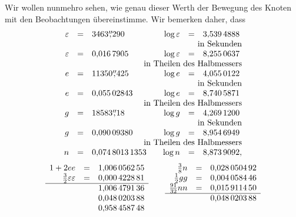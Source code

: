 \clearpage
\begingroup
{}
\renewcommand{\headrulewidth}{0pt}
\par\noindent\hspace*{\parindent}Wir wollen nunmehro sehen, wie genau dieser Werth der Bewegung des
Knoten mit den Beobachtungen übereinstimme. Wir bemerken daher, dass
\begingroup\small
\setlength{\arraycolsep}{2pt}
\renewcommand{\arraystretch}{1.15}
\[
\begin{array}{rcl@{\qquad}rcl}
\varepsilon&=&3463\overset{\prime\prime}{,}290
 &\log\varepsilon&=&3{,}539\,4888\\
\multicolumn{6}{r}{\text{in Sekunden}}\\
\varepsilon&=&0{,}016\,7905
 &\log\varepsilon&=&8{,}255\,0637\\
\multicolumn{6}{r}{\text{in Theilen des Halbmessers}}\\
e&=&11350\overset{\prime\prime}{,}425
 &\log e&=&4{,}055\,0122\\
\multicolumn{6}{r}{\text{in Sekunden}}\\
e&=&0{,}055\,02843
 &\log e&=&8{,}740\,5871\\
\multicolumn{6}{r}{\text{in Theilen des Halbmessers}}\\
g&=&18583\overset{\prime\prime}{,}18
 &\log g&=&4{,}269\,1200\\
\multicolumn{6}{r}{\text{in Sekunden}}\\
g&=&0{,}090\,09380
 &\log g&=&8{,}954\,6949\\
\multicolumn{6}{r}{\text{in Theilen des Halbmessers}}\\
n&=&0{,}074\,8013\,1353
 &\log n&=&8{,}873\,9092,
\end{array}
\]
\[
\begin{array}[t]{rcl}
1+2ee&=&1{,}006\,0562\,55\\
\tfrac32\varepsilon\varepsilon&=&0{,}000\,4228\,81\\
\hline
&&1{,}006\,4791\,36\\
&&0{,}048\,0203\,88\\
&&0{,}958\,4587\,48
\end{array}
\qquad
\begin{array}[t]{rcl}
\tfrac38n&=&0{,}028\,0504\,92\\
\tfrac12gg&=&0{,}004\,0584\,46\\
\tfrac{91}{32}nn&=&0{,}015\,9114\,50\\
\hline
&&0{,}048\,0203\,88
\end{array}
\]
\endgroup
{}
